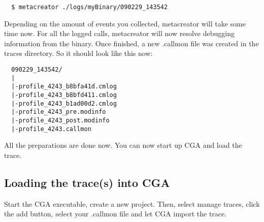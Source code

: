 \begin{verbatim}
  $ metacreator ./logs/myBinary/090229_143542
\end{verbatim}

Depending on the amount of events you collected, metacreator will take some time now. For all the logged calls, metacreator will now resolve debugging information from the binary. Once finished, a new .callmon file was created in the traces directory. So it should look like this now:

\begin{verbatim}
  090229_143542/
  |
  |-profile_4243_b8bfa41d.cmlog
  |-profile_4243_b8bfd411.cmlog
  |-profile_4243_b1ad00d2.cmlog
  |-profile_4243_pre.modinfo
  |-profile_4243_post.modinfo
  |-profile_4243.callmon
\end{verbatim}

All the preparations are done now. You can now start up CGA and load the trace.

\subsection{Loading the trace(s) into CGA} Start the CGA executable, create a new project. Then, select manage traces, click the add button, select your .callmon file and let CGA import the trace.
